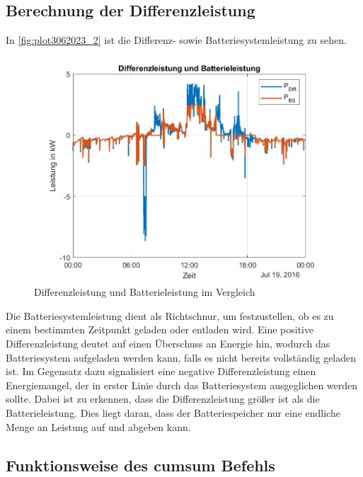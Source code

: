 \subsection{Berechnung der Differenzleistung}
In \autoref{fig:plot3062023_2} ist die Differenz- sowie Batteriesystemleistung zu sehen.
\begin{figure}[H]
    \centering
    \includegraphics[width=\textwidth]{Abbildungen/plot_vorbereitungsfrage3.jpg}
    \caption{Differenzleistung und Batterieleistung im Vergleich}
    \label{fig:plot3062023_2}
\end{figure}
 
Die Batteriesystemleistung dient als Richtschnur, um festzustellen, ob es zu einem bestimmten Zeitpunkt geladen oder entladen wird. 
Eine positive Differenzleistung deutet auf einen Überschuss an Energie hin, wodurch das Batteriesystem aufgeladen werden kann, falls es nicht bereits vollständig geladen ist. Im Gegensatz dazu signalisiert eine negative Differenzleistung einen Energiemangel, der in erster Linie durch das Batteriesystem ausgeglichen werden sollte.
Dabei ist zu erkennen, dass die Differenzleistung größer ist als die Batterieleistung. 
Dies liegt daran, dass der Batteriespeicher nur eine endliche Menge an Leistung auf und abgeben kann.

\subsection{Funktionsweise des cumsum Befehls}

